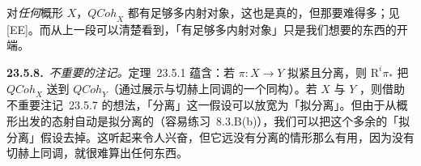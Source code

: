 对\emph{任何}概形 $X$，$\mathit{QCoh}_X$ 都有足够多内射对象，这也是真的，但那要难得多；见 [EE]。而从上一段可以清楚看到，「有足够多内射对象」只是我们想要的东西的开端。

\textbf{23.5.8.}\ \emph{不重要的注记。}\quad \mbox{定理~23.5.1} 蕴含：若 $\pi\colon X\to Y$ 拟紧且分离，则 $\mathrm{R}^i\pi_\ast$ 把 $\mathit{QCoh}_X$ 送到 $\mathit{QCoh}_Y$（通过展示与切赫上同调的一个同构）。若 $X$ 与 $Y$ \trNoether，则借助\mbox{不重要注记~23.5.7} 的想法，「分离」这一假设可以放宽为「拟分离」。但由于从\trNoether{}概形出发的态射自动是拟分离的（\mbox{容易练习~8.3.B}(b)），我们可以把这个多余的「拟分离」假设去掉。这听起来令人兴奋，但它远没有分离的情形那么有用，因为没有切赫上同调，就很难算出任何东西。


